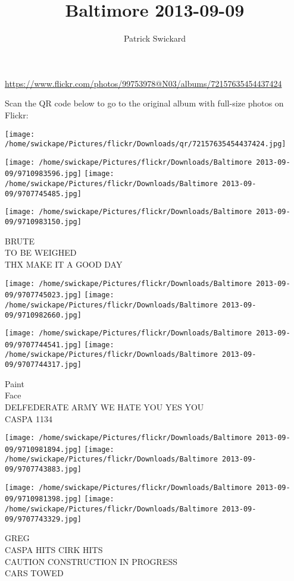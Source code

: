 \documentclass[10pt,letterpaper]{article}
\title{Baltimore 2013-09-09}
\author{Patrick Swickard}
\date{}
\begin{document}
\maketitle

\url{https://www.flickr.com/photos/99753978@N03/albums/72157635454437424}

Scan the QR code below to go to the original album with full-size photos on Flickr:

\texttt{[image: /home/swickape/Pictures/flickr/Downloads/qr/72157635454437424.jpg]}
\pagebreak

\texttt{[image: /home/swickape/Pictures/flickr/Downloads/Baltimore 2013-09-09/9710983596.jpg]}
\texttt{[image: /home/swickape/Pictures/flickr/Downloads/Baltimore 2013-09-09/9707745485.jpg]}

\vspace{0.25in}
\texttt{[image: /home/swickape/Pictures/flickr/Downloads/Baltimore 2013-09-09/9710983150.jpg]}

BRUTE\\
TO BE WEIGHED\\
THX MAKE IT A GOOD DAY
\pagebreak

\texttt{[image: /home/swickape/Pictures/flickr/Downloads/Baltimore 2013-09-09/9707745023.jpg]}
\texttt{[image: /home/swickape/Pictures/flickr/Downloads/Baltimore 2013-09-09/9710982660.jpg]}

\texttt{[image: /home/swickape/Pictures/flickr/Downloads/Baltimore 2013-09-09/9707744541.jpg]}
\texttt{[image: /home/swickape/Pictures/flickr/Downloads/Baltimore 2013-09-09/9707744317.jpg]}

Paint\\
Face\\
DELFEDERATE ARMY WE HATE YOU YES YOU\\
CASPA 1134
\pagebreak

\texttt{[image: /home/swickape/Pictures/flickr/Downloads/Baltimore 2013-09-09/9710981894.jpg]}
\texttt{[image: /home/swickape/Pictures/flickr/Downloads/Baltimore 2013-09-09/9707743883.jpg]}

\texttt{[image: /home/swickape/Pictures/flickr/Downloads/Baltimore 2013-09-09/9710981398.jpg]}
\texttt{[image: /home/swickape/Pictures/flickr/Downloads/Baltimore 2013-09-09/9707743329.jpg]}

GREG\\
CASPA HITS CIRK HITS\\
CAUTION CONSTRUCTION IN PROGRESS\\
CARS TOWED
\pagebreak
\end{document}
